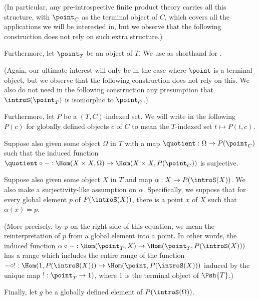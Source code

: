 (In particular, any pre-introspective finite product theory carries all this structure, with $\point_C$ as the terminal object of $C$, which covers all the applications we will be interested in, but we observe that the following construction does not rely on such extra structure.)

Furthermore, let $\point_T$ be an object of $T$. We use  as shorthand for .

(Again, our ultimate interest will only be in the case where $\point$ is a terminal object, but we observe that the following construction does not rely on this. We also do not need in the following construction any presumption that $\introS(\point_T)$ is isomorphic to $\point_C$.)

Furthermore, let $P$ be a $(T, C)$-indexed set. We will write in the following $P(c)$ for globally defined objects $c$ of $C$ to mean the $T$-indexed set $t \mapsto P(t, c)$.

Suppose also given some object $\Omega$ in $T$ with a map $\quotient : \Omega \to P(\point_C)$ such that the induced function $\quotient \circ - : \Hom(X \times X, \Omega) \to \Hom(X \times X, P(\point_C))$ is surjective.

Suppose also given some object $X$ in $T$ and map $\alpha : X \to P(\introS(X))$. We also make a surjectivity-like assumption on $\alpha$. Specifically, we suppose that for every global element $p$ of $P(\introS(X))$, there is a point $x$ of $X$ such that $\alpha(x) = p$.

(More precisely, by $p$ on the right side of this equation, we mean the reinterpretation of $p$ from a global element into a point. In other words, the induced function $\alpha \circ - : \Hom(\point_T, X) \to \Hom(\point_T, P(\introS(X)))$ has a range which includes the entire range of the function $- \circ ! : \Hom(1, P(\introS(X))) \to \Hom(\point, P(\introS(X)))$ induced by the unique map $! : \point_T \to 1)$, where $1$ is the terminal object of $\Psh{T}$.)

Finally, let $g$ be a globally defined element of $P(\introS(\Omega))$.

